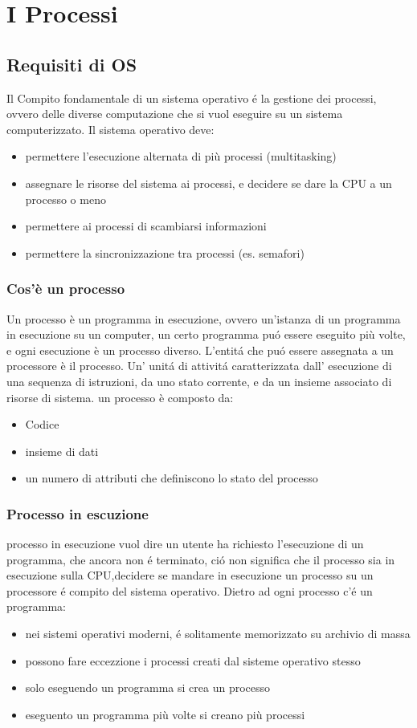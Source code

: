 \usepackage{graphicx}\section{I Processi}
\subsection{Requisiti di OS}
Il  Compito fondamentale di un sistema operativo é la gestione dei processi, ovvero delle diverse computazione che si vuol
eseguire su un sistema computerizzato. Il sistema operativo deve:
\begin{itemize}
    \item permettere l'esecuzione alternata di più processi (multitasking)
    \item assegnare le risorse del sistema ai processi, e decidere se dare la CPU a un processo o meno
    \item permettere ai processi di scambiarsi informazioni
    \item permettere la sincronizzazione tra processi (es. semafori)
\end{itemize}
\subsubsection{Cos'è un processo}
Un processo è un programma in esecuzione, ovvero un'istanza di un programma in esecuzione su un computer, un certo programma
puó essere eseguito più volte, e ogni esecuzione è un processo diverso.
L'entitá che puó essere assegnata a un processore è il processo.
Un' unitá di attivitá caratterizzata dall' esecuzione di una sequenza di istruzioni, da uno stato corrente, e da un insieme
associato di risorse di sistema.
un processo è composto da:
\begin{itemize}
    \item Codice
    \item insieme di dati
    \item un numero di attributi che definiscono lo stato del processo
    \end{itemize}
\subsubsection{Processo in escuzione}
processo in esecuzione vuol dire un utente ha richiesto l'esecuzione di un programma, che ancora non é terminato,
ció non significa che il processo sia in esecuzione sulla CPU,decidere se mandare in esecuzione un processo su un
processore é compito del sistema operativo.
Dietro ad ogni processo c'é un programma:
\begin{itemize}
    \item nei sistemi operativi moderni, é solitamente memorizzato su archivio di massa
    \item possono fare eccezzione i processi creati dal sisteme operativo stesso
    \item solo eseguendo un programma si crea un processo
    \item eseguento un programma più volte si creano più processi
\end{itemize}
